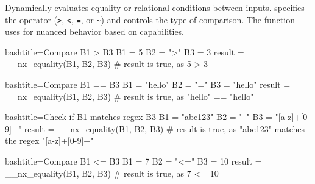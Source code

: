 \begin{NexMainBox}
	\begin{NexMainBox}
		Dynamically evaluates equality or relational conditions between inputs.  specifies the operator (\texttt{>}, \texttt{<}, \texttt{=}, or \texttt{\textasciitilde}) and controls the type of comparison. The function uses  for nuanced behavior based on  capabilities.
	\end{NexMainBox}
	\begin{NexMainBox}
		\begin{NexListDark}
		\end{NexListDark}
	\end{NexMainBox}
\end{NexMainBox}

\begin{NexCodeBox}{bash}{title={Compare B1 > B3}}
	B1 = 5
	B2 = ">"
	B3 = 3
	result = __nx_equality(B1, B2, B3)
	# result is true, as 5 > 3
\end{NexCodeBox}

\begin{NexCodeBox}{bash}{title={Compare B1 == B3}}
	B1 = "hello"
	B2 = "="
	B3 = "hello"
	result = __nx_equality(B1, B2, B3)
	# result is true, as "hello" == "hello"
\end{NexCodeBox}

\begin{NexCodeBox}{bash}{title={Check if B1 matches regex B3}}
	B1 = "abc123"
	B2 = "~"
	B3 = "[a-z]+[0-9]+"
	result = __nx_equality(B1, B2, B3)
	# result is true, as "abc123" matches the regex "[a-z]+[0-9]+"
\end{NexCodeBox}

\begin{NexCodeBox}{bash}{title={Compare B1 <= B3}}
	B1 = 7
	B2 = "<="
	B3 = 10
	result = __nx_equality(B1, B2, B3)
	# result is true, as 7 <= 10
\end{NexCodeBox}

